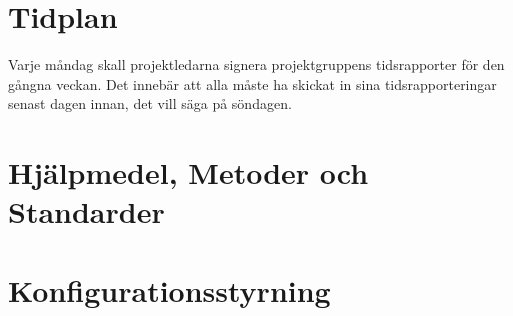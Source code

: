 \documentclass[a4paper]{article}
\begin{document}
\section{Tidplan}
\begin{comment} 
I tidplanen ska det finnas en detaljerad nedbrytning av det arbete som ska ske i aktiviteter. Det ska också finnas skattningar av arbetstid (dvs "effort"), ledtid och datum för när aktiviteter ska vara färdiga. Det betyder att man ska kunna utläsa minst följande: 

1. Skattad tidsåtgång för varje fas (hur fördelas arbetsinsatsen över projektets faser?)
2. Skattad start- och slutdatum för varje fas (när blir olika delar klara?)
3. Skattad tidsåtgång för varje dokument (vad kostar varje del?)
4. Skattad start- och slutdatum för varje dokument (när blir olika dokument klara?)
5. Skattad tidsåtgång för olika aktiviteter och aktivitetstyper i respektive fas (vad lägger man tiden på?). (Möten, granskningar, ändringshantering, rapportering, osv)
6. Skattad tidåtgång för varje grupp, uppdelat per vecka (går det in på en 40-timmarsvecka?)
7. En kalenderplan där man kan se vad varje grupp ska göra varje vecka (vem ska göra vad och när?) Detta kan tex åskådliggöras i ett gantt-schema.
8. Det ska även vara tydligt vilka möten som är planerade under projektet, både interna möten och möten där externa intressenter är med.

Ange även i projektplanen vilka metoder ni använt för att göra skattningar av tid och kostnad, samt vilka de största osäkerheterna är med skattningarna.

\end{comment}

Varje måndag skall projektledarna signera projektgruppens tidsrapporter för den gångna veckan. Det innebär att alla måste ha skickat in sina tidsrapporteringar senast dagen innan, det vill säga på söndagen. 

\section{Hjälpmedel, Metoder och Standarder}
\begin{comment}En beskrivning av ovanstående som projektet avser att använda.\end{comment}

\section{Konfigurationsstyrning}
\begin{comment}En beskrivning av konfigurationsstyrningen (CM), se kapitel 4 i röda boken. Konfigurationsstyrningen beskriver hur projektbiblioteket är organiserat och hur ändringshanteringen fungerar.


I samband med projektplanen är det också viktigt att tänka på att det i slutet av projektet skall skrivas en slutrapport. Detta betyder att man redan vid skrivandet av planen bör överväga hur slutrapporten skall se ut så att man enkelt kan stämma av med projektplanen.
\end{comment}
\end{document}

